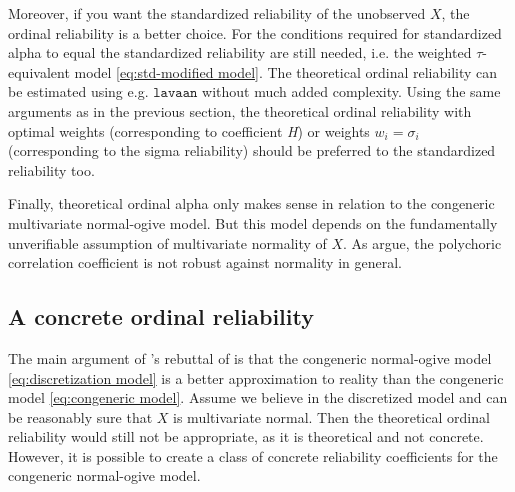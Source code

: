 \documentclass[twoside]{article}
\begin{document}
Moreover, if you want the standardized reliability of the unobserved $X$, the ordinal reliability is a better choice. For the conditions required for standardized alpha to equal the standardized reliability are still needed, i.e. the weighted $\tau$-equivalent model \eqref{eq:std-modified model}. The theoretical ordinal reliability can be estimated using e.g. $\mathtt{lavaan}$ without much added complexity. Using the same arguments as in the previous section, the theoretical ordinal reliability with optimal weights (corresponding to coefficient \textit{H}) or weights $w_{i}=\sigma_{i}$ (corresponding to the sigma reliability) should be preferred to the standardized reliability too.

Finally, theoretical ordinal alpha only makes sense in relation to the congeneric multivariate normal-ogive model. But this model depends on the fundamentally unverifiable assumption of multivariate normality of $X$. As \citet{Foldnes2019-yd} argue, the polychoric correlation coefficient is not robust against normality in general.

\subsection{A concrete ordinal reliability}

The main argument of \citet{Zumbo2019-lm}'s rebuttal of \citet{Chalmers2018-fj} is that the congeneric normal-ogive model \eqref{eq:discretization model}  is a better approximation to reality than the congeneric model \eqref{eq:congeneric model}. Assume we believe in the discretized model and can be reasonably sure that $X$ is multivariate normal. Then the theoretical ordinal reliability would still not be appropriate, as it is theoretical and not concrete. However, it is possible to create a class of concrete reliability coefficients for the congeneric normal-ogive model.
\end{document}
